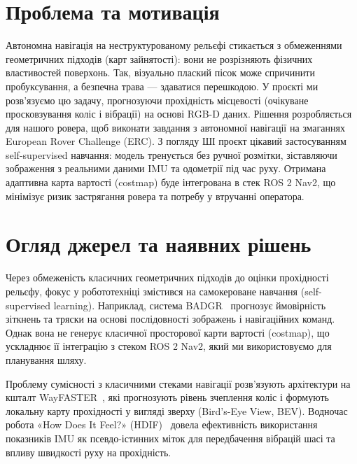\documentclass[ukrainian]{ucuproposal}
\begin{document}
\maketitlepage

\section{Проблема та мотивація}
Автономна навігація на неструктурованому рельєфі стикається з обмеженнями геометричних підходів (карт зайнятості): вони не розрізняють фізичних властивостей поверхонь. Так, візуально плаский пісок може спричинити пробуксування, а безпечна трава — здаватися перешкодою. У проєкті ми розв'язуємо цю задачу, прогнозуючи прохідність місцевості (очікуване просковзування коліс і вібрації) на основі RGB-D даних. Рішення розробляється для нашого ровера, щоб виконати завдання з автономної навігації на змаганнях European Rover Challenge (ERC). З погляду ШІ проєкт цікавий застосуванням self-supervised навчання: модель тренується без ручної розмітки, зіставляючи зображення з реальними даними IMU та одометрії під час руху. Отримана адаптивна карта вартості (costmap) буде інтегрована в стек ROS 2 Nav2, що мінімізує ризик застрягання ровера та потребу у втручанні оператора.

\section{Огляд джерел та наявних рішень}
Через обмеженість класичних геометричних підходів до оцінки прохідності рельєфу, фокус у робототехніці змістився на самокероване навчання (self-supervised learning). Наприклад, система BADGR~\cite{kahn2021badgr} прогнозує ймовірність зіткнень та тряски на основі послідовності зображень і навігаційних команд. Однак вона не генерує класичної просторової карти вартості (costmap), що ускладнює її інтеграцію з стеком ROS 2 Nav2, який ми використовуємо для планування шляху.

Проблему сумісності з класичними стеками навігації розв'язують архітектури на кшталт WayFASTER~\cite{gasparino2024wayfaster}, які прогнозують рівень зчеплення коліс і формують локальну карту прохідності у вигляді зверху (Bird's-Eye View, BEV). Водночас робота «How Does It Feel?» (HDIF)~\cite{castro2023hdif} довела ефективність використання показників IMU як псевдо-істинних міток для передбачення вібрацій шасі та впливу швидкості руху на прохідність.
\end{document}

